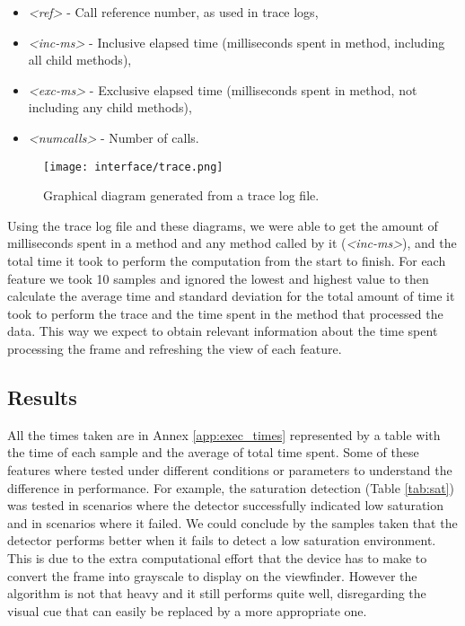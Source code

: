 \begin{itemize}
\item \emph{<ref>} - Call reference number, as used in trace logs,
\item \emph{<inc-ms>} - Inclusive elapsed time (milliseconds spent in method, including all child methods),
\item \emph{<exc-ms>} - Exclusive elapsed time (milliseconds spent in method, not including any child methods),
\item \emph{<numcalls>} - Number of calls.
\end{itemize}

\begin{figure}[htb]
	\centering
	\texttt{[image: interface/trace.png]}
	\caption{Graphical diagram generated from a trace log file.}
	\label{fig:trace_ex}
\end{figure}

Using the trace log file and these diagrams, we were able to get the amount of milliseconds spent in a method and any method called by it (\emph{<inc-ms>}), and the total time it took to perform the computation from the start to finish.
For each feature we took 10 samples and ignored the lowest and highest value to then calculate the average time and standard deviation for the total amount of time it took to perform the trace and the time spent in the method that processed the data. This way we expect to obtain relevant information about the time spent processing the frame and refreshing the view of each feature.

\subsection{Results}

All the times taken are in Annex \ref{app:exec_times} represented by a table with the time of each sample and the average of total time spent.
Some of these features where tested under different conditions or parameters to understand the difference in performance. For example, the saturation detection (Table \ref{tab:sat}) was tested in scenarios where the detector successfully indicated low saturation and in scenarios where it failed. We could conclude by the samples taken that the detector performs better when it fails to detect a low saturation environment. This is due to the extra computational effort that the device has to make to convert the frame into grayscale to display on the viewfinder. However the algorithm is not that heavy and it still performs quite well, disregarding the visual cue that can easily be replaced by a more appropriate one.

